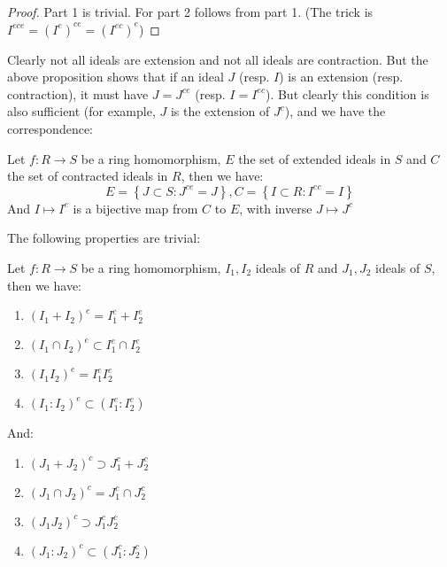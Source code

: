 \documentclass{note-eng}
\begin{document}
\begin{proof}
    Part 1 is trivial. For part 2 follows from part 1. (The trick is $I^{ece} = (I^e)^{ce} = (I^{ec})^e$)
\end{proof}

Clearly not all ideals are extension and not all ideals are contraction. But the above proposition shows that if an ideal $J$ (resp. $I$) is an extension (resp. contraction), it must have $J = J^{ce}$ (resp. $I = I^{ec}$). But clearly this condition is also sufficient (for example, $J$ is the extension of $J^c$), and we have the correspondence:

\begin{proposition}
    Let $f: R \rightarrow S$ be a ring homomorphism, $E$ the set of extended ideals in $S$ and $C$ the set of contracted ideals in $R$, then we have:
    $$E = \left\lbrace J \subset S: J^{ce} = J \right\rbrace, C = \left\lbrace I \subset R: I^{ec} = I \right\rbrace$$
    And $I \mapsto I^e$ is a bijective map from $C$ to $E$, with inverse $J \mapsto J^c$
\end{proposition}

The following properties are trivial:

\begin{proposition}
    Let $f: R \rightarrow S$ be a ring homomorphism, $I_1, I_2$ ideals of $R$ and $J_1, J_2$ ideals of $S$, then we have:
    \begin{enumerate}
        \item $(I_1 + I_2)^e = I_1^e + I_2^e$
        \item $(I_1 \cap I_2)^e \subset I_1^e \cap I_2^e$
        \item $(I_1I_2)^e = I_1^eI_2^e$
        \item $(I_1 : I_2)^e \subset (I_1^e : I_2^e)$
    \end{enumerate}
    And:
    \begin{enumerate}
        \item $(J_1 + J_2)^c \supset J_1^c + J_2^c$
        \item $(J_1 \cap J_2)^c = J_1^c \cap J_2^c$
        \item $(J_1J_2)^c \supset J_1^c J_2^c$
        \item $(J_1 : J_2)^c \subset (J_1^c : J_2^c)$
    \end{enumerate}
\end{proposition}
\end{document}
